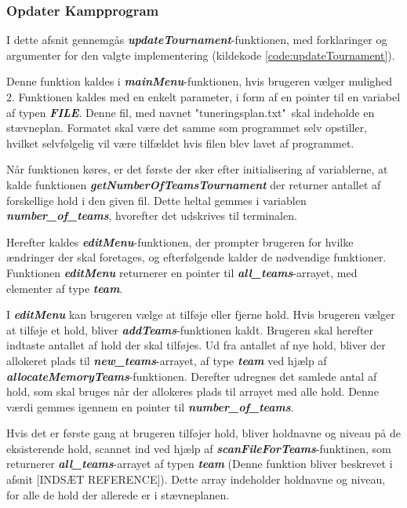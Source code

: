 \subsubsection{Opdater Kampprogram}
I dette afsnit gennemgås \textbf{\textit{updateTournament}}-funktionen, med forklaringer og argumenter for den valgte implementering (kildekode \ref{code:updateTournament}).
\par
Denne funktion kaldes i \textbf{\textit{mainMenu}}-funktionen, hvis brugeren vælger mulighed 2. Funktionen kaldes med en enkelt parameter, i form af en pointer til en variabel af typen \textbf{\textit{FILE}}. Denne fil, med navnet "tuneringsplan.txt"\ skal indeholde en stævneplan. Formatet skal være det samme som programmet selv opstiller, hvilket selvfølgelig vil være tilfældet hvis filen blev lavet af programmet.
\par
Når funktionen køres, er det første der sker efter initialisering af variablerne, at kalde funktionen \textbf{\textit{getNumberOfTeamsTournament}} der returner antallet af forskellige hold i den given fil. Dette heltal gemmes i variablen \textbf{\textit{number\_of\_teams}}, hvorefter det udskrives til terminalen. 
\par
Herefter kaldes \textbf{\textit{editMenu}}-funktionen, der prompter brugeren for hvilke ændringer der skal foretages, og efterfølgende kalder de nødvendige funktioner. Funktionen \textbf{\textit{editMenu}} returnerer en pointer til \textbf{\textit{all\_teams}}-arrayet, med elementer af type \textbf{\textit{team}}. 
\par
I \textbf{\textit{editMenu}} kan brugeren vælge at tilføje eller fjerne hold. Hvis brugeren vælger at tilføje et hold, bliver \textbf{\textit{addTeams}}-funktionen kaldt. Brugeren skal herefter indtaste antallet af hold der skal tilføjes. Ud fra antallet af nye hold, bliver der allokeret plads til \textbf{\textit{new\_teams}}-arrayet, af type \textbf{\textit{team}} ved hjælp af \textbf{\textit{allocateMemoryTeams}}-funktionen. Derefter udregnes det samlede antal af hold, som skal bruges når der allokeres plads til arrayet med alle hold. Denne værdi gemmes igennem en pointer til \textbf{\textit{number\_of\_teams}}.
\par
Hvis det er første gang at brugeren tilføjer hold, bliver holdnavne og niveau på de eksisterende hold, scannet ind ved hjælp af \textbf{\textit{scanFileForTeams}}-funktinen, som returnerer \textbf{\textit{all\_teams}}-arrayet af typen \textbf{\textit{team}} (Denne funktion bliver beskrevet i afsnit [INDSÆT REFERENCE]). Dette array indeholder holdnavne og niveau, for alle de hold der allerede er i stævneplanen. 
